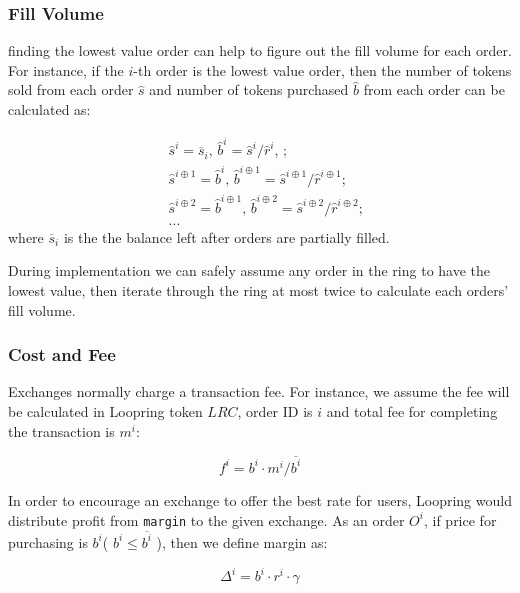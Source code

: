 \documentclass[UTF8,nofonts]{article}
\begin{document}
\subsubsection{Fill Volume\label{sec: matchquantity}}

finding the lowest value order can help to figure out the fill volume for each order. For instance, if the $i$-th order is the lowest value order, then the number of tokens sold from each order $\hat{s}$ and number of tokens purchased $\hat{b}$ from each order can be calculated as:

\[
\begin{split}
&\hat{s}^{i}=\overline{s}_i\text{, } \hat{b}^{i}=\hat{s}^{i}/ \hat{r}^i\text{, }\text{;}\\
&\hat{s}^{i\oplus 1}=\hat{b}^i\text{, } \hat{b}^{i\oplus 1}=\hat{s}^{i\oplus 1}/ \hat{r}^{i\oplus 1}\text{;}\\
&\hat{s}^{i\oplus 2}=\hat{b}^{i\oplus 1}\text{, } \hat{b}^{i\oplus 2}=\hat{s}^{i\oplus 2}/ \hat{r}^{i\oplus 2}\text{;}\\
& ...
\end{split}
\]
where $\overline{s}_i$ is the the balance left after orders are partially filled.

During implementation we can safely assume any order in the ring to have the lowest value, then iterate through the ring at most twice to calculate each orders' fill volume. 

\subsubsection{Cost and Fee\label{sec: fee}}

Exchanges normally charge a transaction fee. For instance, we assume the fee will be calculated in Loopring token $LRC$, order ID is $i$ and total fee for completing the transaction is $m^i$: 

\begin{equation*}
f^i = b^i \cdot m^i / \overline{b^i}
\end{equation*}


In order to encourage an exchange to offer the best rate for users, Loopring would distribute profit from \texttt{margin} to the given exchange. As an order $O^i$,  if price for purchasing is $b^i$( $b^i \le \overline{b^i}$ ),  then we define margin as: 

\begin{equation*}
\Delta^i = b^i \cdot r^i \cdot \gamma
\end{equation*}
\end{document}
